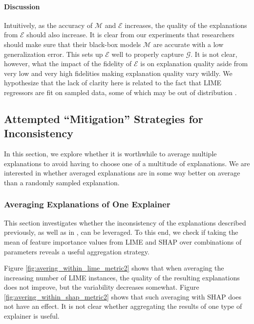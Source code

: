\documentclass[12pt]{article}    %
\begin{document}
\paragraph{Discussion}
    Intuitively, as the accuracy of $\mathcal{M}$ and $\mathcal{E}$ increases, the quality of the explanations from $\mathcal{E}$ should also increase. It is clear from our experiments that researchers should make sure that their black-box models $\mathcal{M}$ are accurate with a low generalization error. This sets up $\mathcal{E}$ well to properly capture $\mathcal{G}$. It is not clear, however, what the impact of the fidelity of $\mathcal{E}$ is on explanation quality aside from very low and very high fidelities making explanation quality vary wildly. We hypothesize that the lack of clarity here is related to the fact that LIME regressors are fit on sampled data, some of which may be out of distribution \citep{rahnama19shift}.

\subsection*{Attempted ``Mitigation'' Strategies for Inconsistency} 
\label{sec:inconsistency_mitigation}
    In this section, we explore whether it is worthwhile to average multiple explanations to avoid having to choose one of a multitude of explanations. We are interested in whether averaged explanations are in some way better on average than a randomly sampled explanation. 

\subsubsection*{Averaging Explanations of One Explainer}
    This section investigates whether the inconsistency of the explanations described previously, as well as in \citep{kommiya21towards}, can be leveraged. To this end, we check if taking the mean of feature importance values from LIME and SHAP over combinations of parameters reveals a useful aggregation strategy. \par
    
    Figure \ref{fig:avering_within_lime_metric2} shows that when averaging the increasing number of LIME instances, the quality of the resulting explanations does not improve, but the variability decreases somewhat. Figure \ref{fig:avering_within_shap_metric2} shows that such averaging with SHAP does not have an effect. It is not clear whether aggregating the results of one type of explainer is useful. 
\end{document}
